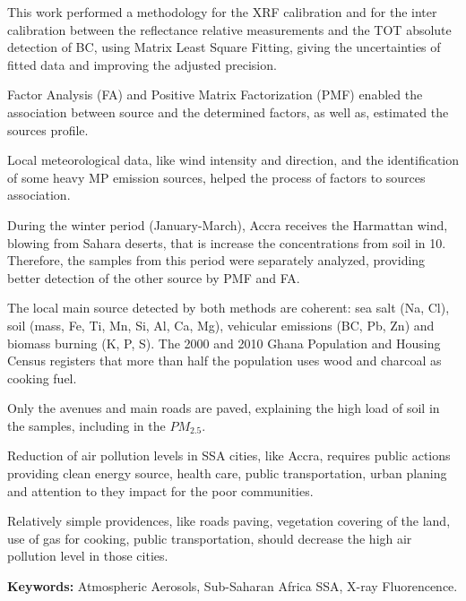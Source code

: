 This work performed a methodology for the XRF calibration and for 
the inter calibration between the reflectance relative measurements 
and the TOT absolute detection of BC, 
using Matrix Least Square Fitting, giving the uncertainties of 
fitted data and improving the adjusted precision.


Factor Analysis (FA) and Positive Matrix Factorization (PMF) 
enabled the association between source and the determined factors, 
as well as, estimated the sources profile. 

Local meteorological data, like wind intensity and direction, 
and the identification of some heavy MP emission sources, 
helped the process of factors to sources association. 

During the winter period (January-March), Accra receives the 
Harmattan wind, blowing from Sahara deserts, that is increase
the concentrations from soil in 10. Therefore, the samples from 
this period were separately analyzed, providing better detection 
of the other source by PMF and FA.

The local main source detected by both methods are coherent: 
sea salt (Na, Cl), soil (mass, Fe, Ti, Mn, Si, Al, Ca, Mg), 
vehicular emissions (BC, Pb, Zn) and biomass burning (K, P, S). 
The 2000 and 2010 Ghana Population and Housing Census registers 
that more than half the population uses wood and charcoal as cooking fuel. 

Only the avenues and main roads are paved, explaining the high 
load of soil in the samples, including in the $PM_{2.5}$.

Reduction of air pollution levels in SSA cities, like Accra, 
requires public actions providing clean energy source, health care, 
public transportation, urban planing and attention to they impact for 
the poor communities. 

Relatively simple providences, like roads paving, vegetation 
covering of the land, use of gas for cooking, public transportation, 
should decrease the high air pollution level in those cities.

\par
\vspace{1em}
\noindent\textbf{Keywords:} Atmospheric Aerosols, Sub-Saharan Africa SSA, X-ray Fluorencence.

